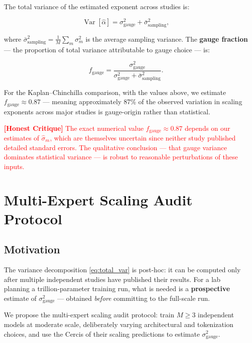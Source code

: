 \documentclass[12pt,a4paper]{article}
\theoremstyle{remark}
\DeclareMathOperator{\Var}{Var}
\newcommand{\honestcrit}[1]{\textcolor{red}{\textbf{[Honest Critique]} #1}}
\begin{document}
The total variance of the estimated exponent across studies is:

\begin{equation}
\Var[\hat{\alpha}] = \sigma^2_{\text{gauge}} + \bar{\sigma}^2_{\text{sampling}},
\label{eq:total_var}
\end{equation}

where $\bar{\sigma}^2_{\text{sampling}} = \frac{1}{M} \sum_m \sigma^2_m$ is the average sampling variance. The \textbf{gauge fraction} — the proportion of total variance attributable to gauge choice — is:

\begin{equation}
f_{\text{gauge}} = \frac{\sigma^2_{\text{gauge}}}{\sigma^2_{\text{gauge}} + \bar{\sigma}^2_{\text{sampling}}}.
\label{eq:gauge_fraction}
\end{equation}

For the Kaplan--Chinchilla comparison, with the values above, we estimate $f_{\text{gauge}} \approx 0.87$ — meaning approximately 87\% of the observed variation in scaling exponents across major studies is gauge-origin rather than statistical.

\honestcrit{The exact numerical value $f_{\text{gauge}} \approx 0.87$ depends on our estimates of $\hat{\sigma}_m$, which are themselves uncertain since neither study published detailed standard errors. The qualitative conclusion — that gauge variance dominates statistical variance — is robust to reasonable perturbations of these inputs.}

\section{Multi-Expert Scaling Audit Protocol}
\label{sec:audit}

\subsection{Motivation}

The variance decomposition \eqref{eq:total_var} is post-hoc: it can be computed only after multiple independent studies have published their results. For a lab planning a trillion-parameter training run, what is needed is a \textbf{prospective} estimate of $\sigma^2_{\text{gauge}}$ — obtained \emph{before} committing to the full-scale run.

We propose the multi-expert scaling audit protocol: train $M \geq 3$ independent models at moderate scale, deliberately varying architectural and tokenization choices, and use the Cercis of their scaling predictions to estimate $\sigma^2_{\text{gauge}}$.
\end{document}
